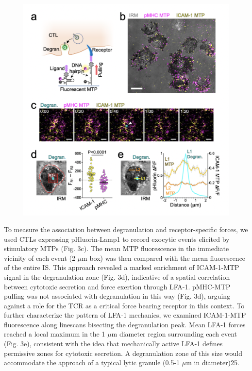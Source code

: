 \begin{figure}[h!]
	\ContinuedFloat
    \centering
    \captionsetup{labelformat=adja-page}
    \includegraphics[width=\textwidth]{../figures/chapter3/fig3mtp.png}
    \caption[]{}
\end{figure}

To measure the association between degranulation and receptor-specific forces, we used CTLs expressing pHluorin-Lamp1 to record exocytic events elicited by stimulatory MTPs (Fig. 3c). The mean MTP fluorescence in the immediate vicinity of each event (2 $\mu$m box) was then compared with the mean fluorescence of the entire IS. This approach revealed a marked enrichment of ICAM-1-MTP signal in the degranulation zone (Fig. 3d), indicative of a spatial correlation between cytotoxic secretion and force exertion through LFA-1. pMHC-MTP pulling was not associated with degranulation in this way (Fig. 3d), arguing against a role for the TCR as a critical force bearing receptor in this context. To further characterize the pattern of LFA-1 mechanics, we examined ICAM-1-MTP fluorescence along linescans bisecting the degranulation peak. Mean LFA-1 forces reached a local maximum in the 1 $\mu$m diameter region surrounding each event (Fig. 3e), consistent with the idea that mechanically active LFA-1 defines permissive zones for cytotoxic secretion. A degranulation zone of this size would accommodate the approach of a typical lytic granule (0.5-1 $\mu$m in diameter)25. 

